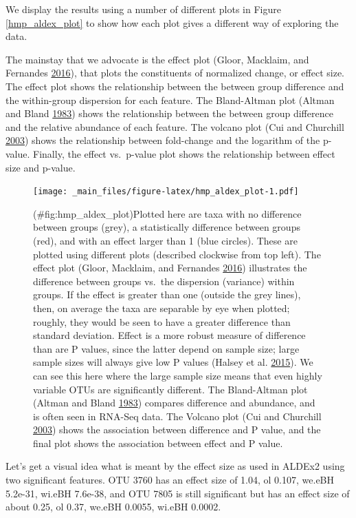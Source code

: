 \documentclass[onecolumn]{book}
\theoremstyle{definition}
\theoremstyle{definition}
\theoremstyle{definition}
\theoremstyle{remark}
\begin{document}
We display the results using a number of different plots in Figure
\ref{hmp_aldex_plot} to show how each plot gives a different way of
exploring the data.

The mainstay that we advocate is the effect plot (Gloor, Macklaim, and
Fernandes \protect\hyperlink{ref-Gloor:2015}{2016}), that plots the
constituents of normalized change, or effect size. The effect plot shows
the relationship between the between group difference and the
within-group dispersion for each feature. The Bland-Altman plot (Altman
and Bland \protect\hyperlink{ref-altman:1983}{1983}) shows the
relationship between the between group difference and the relative
abundance of each feature. The volcano plot (Cui and Churchill
\protect\hyperlink{ref-Cui:2003aa}{2003}) shows the relationship between
fold-change and the logarithm of the p-value. Finally, the effect
vs.~p-value plot shows the relationship between effect size and p-value.

\begin{figure}
\centering
\texttt{[image: \_main\_files/figure-latex/hmp\_aldex\_plot-1.pdf]}
\caption{(\#fig:hmp\_aldex\_plot)Plotted here are taxa with no
difference between groups (grey), a statistically difference between
groups (red), and with an effect larger than 1 (blue circles). These are
plotted using different plots (described clockwise from top left). The
effect plot (Gloor, Macklaim, and Fernandes
\protect\hyperlink{ref-Gloor:2015}{2016}) illustrates the difference
between groups vs.~the dispersion (variance) within groups. If the
effect is greater than one (outside the grey lines), then, on average
the taxa are separable by eye when plotted; roughly, they would be seen
to have a greater difference than standard deviation. Effect is a more
robust measure of difference than are P values, since the latter depend
on sample size; large sample sizes will always give low P values (Halsey
et al. \protect\hyperlink{ref-Halsey:2015aa}{2015}). We can see this
here where the large sample size means that even highly variable OTUs
are significantly different. The Bland-Altman plot (Altman and Bland
\protect\hyperlink{ref-altman:1983}{1983}) compares difference and
abundance, and is often seen in RNA-Seq data. The Volcano plot (Cui and
Churchill \protect\hyperlink{ref-Cui:2003aa}{2003}) shows the
association between difference and P value, and the final plot shows the
association between effect and P value.}
\end{figure}

Let's get a visual idea what is meant by the effect size as used in
ALDEx2 using two significant features. OTU 3760 has an effect size of
1.04, ol 0.107, we.eBH 5.2e-31, wi.eBH 7.6e-38, and OTU 7805 is still
significant but has an effect size of about 0.25, ol 0.37, we.eBH
0.0055, wi.eBH 0.0002.
\end{document}
